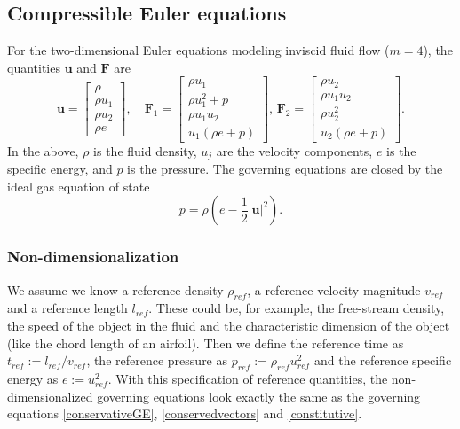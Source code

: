 \documentclass[11pt]{article}
\let\bld\boldsymbol
\begin{document}
\subsection{Compressible Euler equations}
For the two-dimensional Euler equations modeling inviscid fluid flow  ($m=4$), the quantities $\bld{u}$ and $\bld{F}$ are
\begin{equation}
\bld{u} = 
\begin{bmatrix}
\rho \\ \rho u_1 \\ \rho u_2 \\ \rho e
\end{bmatrix}, \quad
\bld{F}_1 = 
\begin{bmatrix}
\rho u_1 \\ \rho u_1^2 + p \\ \rho u_1 u_2 \\ u_1 (\rho e + p)
\end{bmatrix}, \,
\bld{F}_2 = 
\begin{bmatrix}
\rho u_2 \\ \rho u_1 u_2 \\ \rho u_2^2 \\ u_2 (\rho e + p)
\end{bmatrix}.
\label{conservedvectors}
\end{equation}
In the above, $\rho$ is the fluid density, $u_j$ are the velocity components, $e$ is the specific energy, and $p$ is the pressure. The governing equations are closed by the ideal gas equation of state
\begin{equation}
p = \rho (e - \frac12 \vert \bld{u} \vert^2).
\label{constitutive}
\end{equation}

\subsubsection{Non-dimensionalization}
We assume we know a reference density $\rho_{ref}$, a reference velocity magnitude $v_{ref}$ and a reference length $l_{ref}$. These could be, for example, the free-stream density, the speed of the object in the fluid and the characteristic dimension of the object (like the chord length of an airfoil). Then we define the reference time as $t_{ref} := l_{ref}/v_{ref}$, the reference pressure as $p_{ref} := \rho_{ref}u_{ref}^2$ and the reference specific energy as $e := u_{ref}^2$. With this specification of reference quantities, the non-dimensionalized governing equations look exactly the same as the governing equations \eqref{conservativeGE}, \eqref{conservedvectors} and \eqref{constitutive}.
\end{document}
